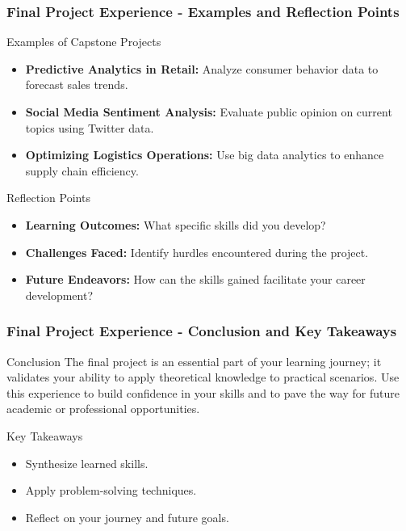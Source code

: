 \documentclass[aspectratio=169]{beamer}
\begin{document}
\begin{frame}[fragile]
    \frametitle{Final Project Experience - Examples and Reflection Points}
    \begin{block}{Examples of Capstone Projects}
        \begin{itemize}
            \item \textbf{Predictive Analytics in Retail:} Analyze consumer behavior data to forecast sales trends.
            \item \textbf{Social Media Sentiment Analysis:} Evaluate public opinion on current topics using Twitter data.
            \item \textbf{Optimizing Logistics Operations:} Use big data analytics to enhance supply chain efficiency.
        \end{itemize}
    \end{block}
    
    \begin{block}{Reflection Points}
        \begin{itemize}
            \item \textbf{Learning Outcomes:} What specific skills did you develop?
            \item \textbf{Challenges Faced:} Identify hurdles encountered during the project.
            \item \textbf{Future Endeavors:} How can the skills gained facilitate your career development?
        \end{itemize}
    \end{block}
\end{frame}

\begin{frame}[fragile]
    \frametitle{Final Project Experience - Conclusion and Key Takeaways}
    \begin{block}{Conclusion}
        The final project is an essential part of your learning journey; it validates your ability to apply theoretical knowledge to practical scenarios. 
        Use this experience to build confidence in your skills and to pave the way for future academic or professional opportunities.
    \end{block}
    
    \begin{block}{Key Takeaways}
        \begin{itemize}
            \item Synthesize learned skills.
            \item Apply problem-solving techniques.
            \item Reflect on your journey and future goals.
        \end{itemize}
    \end{block}
\end{frame}
\end{document}
